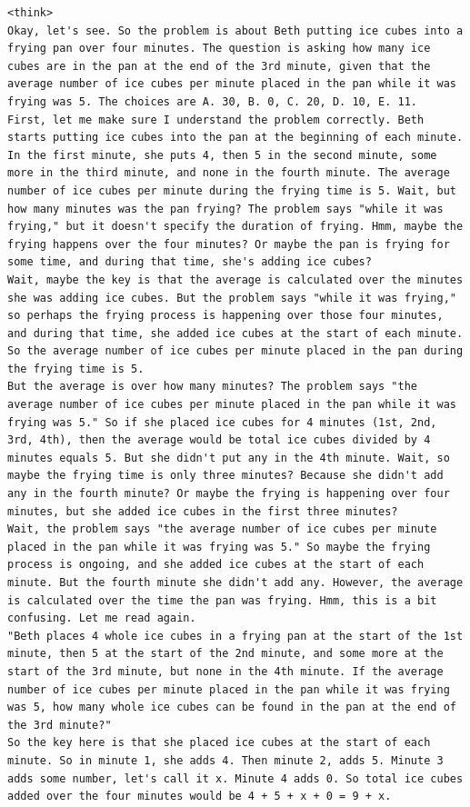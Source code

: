 \documentclass{article}
\theoremstyle{plain}
\theoremstyle{definition}
\theoremstyle{remark}
\begin{document}
\begin{lstlisting}
<think>
Okay, let's see. So the problem is about Beth putting ice cubes into a frying pan over four minutes. The question is asking how many ice cubes are in the pan at the end of the 3rd minute, given that the average number of ice cubes per minute placed in the pan while it was frying was 5. The choices are A. 30, B. 0, C. 20, D. 10, E. 11.
First, let me make sure I understand the problem correctly. Beth starts putting ice cubes into the pan at the beginning of each minute. In the first minute, she puts 4, then 5 in the second minute, some more in the third minute, and none in the fourth minute. The average number of ice cubes per minute during the frying time is 5. Wait, but how many minutes was the pan frying? The problem says "while it was frying," but it doesn't specify the duration of frying. Hmm, maybe the frying happens over the four minutes? Or maybe the pan is frying for some time, and during that time, she's adding ice cubes?
Wait, maybe the key is that the average is calculated over the minutes she was adding ice cubes. But the problem says "while it was frying," so perhaps the frying process is happening over those four minutes, and during that time, she added ice cubes at the start of each minute. So the average number of ice cubes per minute placed in the pan during the frying time is 5.
But the average is over how many minutes? The problem says "the average number of ice cubes per minute placed in the pan while it was frying was 5." So if she placed ice cubes for 4 minutes (1st, 2nd, 3rd, 4th), then the average would be total ice cubes divided by 4 minutes equals 5. But she didn't put any in the 4th minute. Wait, so maybe the frying time is only three minutes? Because she didn't add any in the fourth minute? Or maybe the frying is happening over four minutes, but she added ice cubes in the first three minutes?
Wait, the problem says "the average number of ice cubes per minute placed in the pan while it was frying was 5." So maybe the frying process is ongoing, and she added ice cubes at the start of each minute. But the fourth minute she didn't add any. However, the average is calculated over the time the pan was frying. Hmm, this is a bit confusing. Let me read again.
"Beth places 4 whole ice cubes in a frying pan at the start of the 1st minute, then 5 at the start of the 2nd minute, and some more at the start of the 3rd minute, but none in the 4th minute. If the average number of ice cubes per minute placed in the pan while it was frying was 5, how many whole ice cubes can be found in the pan at the end of the 3rd minute?"
So the key here is that she placed ice cubes at the start of each minute. So in minute 1, she adds 4. Then minute 2, adds 5. Minute 3 adds some number, let's call it x. Minute 4 adds 0. So total ice cubes added over the four minutes would be 4 + 5 + x + 0 = 9 + x.

\end{lstlisting}
\end{document}
